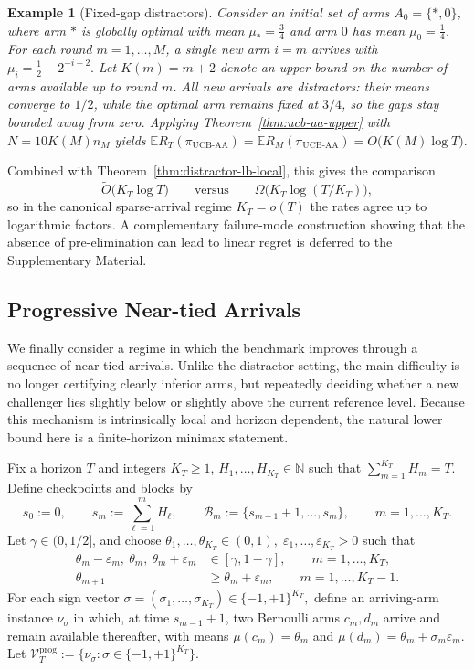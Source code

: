 \documentclass[
  12pt]{article}
\newtheorem{example}{Example}
\begin{document}
\begin{example}[Fixed-gap distractors]
\label{exp:distractors}
Consider an initial set of arms $A_0=\{*,0\}$, where arm $*$ is globally optimal with mean
$\mu_*=\tfrac34$ and arm $0$ has mean $\mu_0=\tfrac14$. For each round $m=1,\dots,M$, a
single new arm $i=m$ arrives with
\(
\mu_i=\frac12-2^{-i-2}.
\)
Let $K(m)=m+2$ denote an upper bound on the number of arms available up to round $m$.
All new arrivals are distractors: their means converge to $1/2$, while the optimal arm remains
fixed at $3/4$, so the gaps stay bounded away from zero. Applying
Theorem~\ref{thm:ucb-aa-upper} with $N=10K(M)n_M$ yields
\(
\mathbb E R_T(\pi_{\mathrm{UCB\text{-}AA}})
=
\mathbb E R_M(\pi_{\mathrm{UCB\text{-}AA}})
=
\widetilde O\bigl(K(M)\log T\bigr).
\)
\end{example}

Combined with Theorem~\ref{thm:distractor-lb-local}, this gives the comparison
\[
\widetilde O\bigl(K_T\log T\bigr)
\qquad\text{versus}\qquad
\Omega\bigl(K_T\log(T/K_T)\bigr),
\]
so in the canonical sparse-arrival regime $K_T=o(T)$ the rates agree up to logarithmic factors.
A complementary failure-mode construction showing that the absence of pre-elimination can lead
to linear regret is deferred to the Supplementary Material.

\subsection{Progressive Near-tied Arrivals}

We finally consider a regime in which the benchmark improves through a sequence of near-tied
arrivals. Unlike the distractor setting, the main difficulty is no longer certifying clearly inferior
arms, but repeatedly deciding whether a new challenger lies slightly below or slightly above the
current reference level. Because this mechanism is intrinsically local and horizon dependent, the
natural lower bound here is a finite-horizon minimax statement.

Fix a horizon $T$ and integers $K_T\ge1$, $H_1,\dots,H_{K_T}\in\mathbb N$ such that
\(
\sum_{m=1}^{K_T} H_m=T.
\)
Define checkpoints and blocks by
\[
s_0:=0,
\qquad
s_m:=\sum_{\ell=1}^m H_\ell,
\qquad
\mathcal B_m:=\{s_{m-1}+1,\dots,s_m\},
\qquad
m=1,\dots,K_T.
\]
Let $\gamma\in(0,1/2]$, and choose
\(
\theta_1,\dots,\theta_{K_T}\in(0,1),
\;
\varepsilon_1,\dots,\varepsilon_{K_T}>0
\) 
such that
\begin{align}
\theta_m-\varepsilon_m,\ \theta_m,\ \theta_m+\varepsilon_m
&\in[\gamma,1-\gamma],
\qquad m=1,\dots,K_T,
\label{eq:prog-lb-interior}
\\
\theta_{m+1}
&\ge \theta_m+\varepsilon_m,
\qquad m=1,\dots,K_T-1.
\label{eq:prog-lb-monotone}
\end{align}
For each sign vector
\(
\sigma=(\sigma_1,\dots,\sigma_{K_T})\in\{-1,+1\}^{K_T},
\)
define an arriving-arm instance $\nu_\sigma$ in which, at time $s_{m-1}+1$, two Bernoulli
arms $c_m,d_m$ arrive and remain available thereafter, with means
\(
\mu(c_m)=\theta_m\) and \(
\mu(d_m)=\theta_m+\sigma_m\varepsilon_m.
\)
Let
\(
\mathcal V_T^{\mathrm{prog}}
:=
\{\nu_\sigma:\sigma\in\{-1,+1\}^{K_T}\}.
\)
\end{document}
